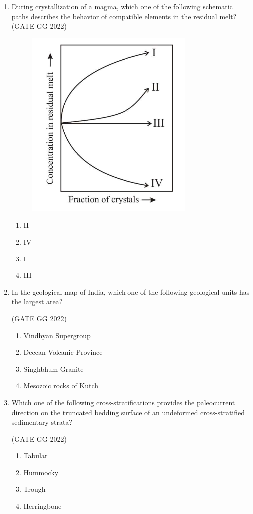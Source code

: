 \documentclass[journal]{IEEEtran}
\begin{document}
\begin{enumerate}[start=1]
\item During crystallization of a magma, which one of the following schematic paths  describes the behavior of compatible elements in the residual melt?
\hfill(GATE GG 2022)
\begin{figure}[H]
\centering
\includegraphics[width = 0.47\columnwidth]{figs/08.png}
\caption*{}
\label{fig:q5}
\end{figure}
\begin{enumerate}
\item II
\item IV
\item I
\item III
\end{enumerate}


\item In the geological map of India, which one of the following geological units has the largest area? 

\hfill(GATE GG 2022)
\begin{enumerate}
\item Vindhyan Supergroup
\item Deccan Volcanic Province
\item Singhbhum Granite
\item Mesozoic rocks of Kutch
\end{enumerate}
\vspace{0.8cm}

\item Which one of the following cross-stratifications provides the paleocurrent direction on the truncated bedding surface of an undeformed cross-stratified sedimentary strata?  

\hfill(GATE GG 2022)
\begin{enumerate}
\item Tabular
\item Hummocky
\item Trough
\item Herringbone
\end{enumerate}
\vspace{0.5cm}


\end{enumerate}
\end{document}
